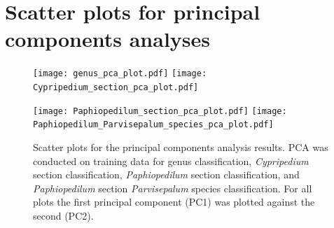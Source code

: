 \documentclass[3p,twocolumn,10pt]{elsarticle}
\begin{document}
\clearpage
\section{Scatter plots for principal components analyses}
\label{sec:pca-plots}

\begin{figure}[!h]
    \minipage{\textwidth}
        \texttt{[image: genus\_pca\_plot.pdf]}
        \texttt{[image: Cypripedium\_section\_pca\_plot.pdf]}
    \endminipage
    \par\vfill
    \minipage{\textwidth}
        \texttt{[image: Paphiopedilum\_section\_pca\_plot.pdf]}
        \texttt{[image: Paphiopedilum\_Parvisepalum\_species\_pca\_plot.pdf]}
    \endminipage
    \caption{Scatter plots for the principal components analysis results. PCA was conducted on training data for genus classification, \textit{Cypripedium} section classification, \textit{Paphiopedilum} section classification, and \textit{Paphiopedilum} section \textit{Parvisepalum} species classification. For all plots the first principal component (PC1) was plotted against the second (PC2).}
    \label{fig:pca-plots}
\end{figure}
\end{document}
